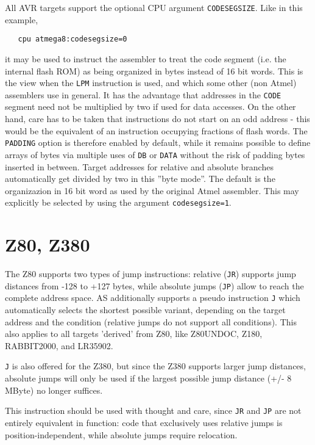 \documentclass[12pt,twoside]{report}
\newcommand{\asname}{{AS}}
\begin{document}
All AVR targets support the optional CPU argument {\tt CODESEGSIZE}.
Like in this example,
\begin{verbatim}
   cpu atmega8:codesegsize=0
\end{verbatim}
it may be used to instruct the assembler to treat the code segment (i.e.
the internal flash ROM) as being organized in bytes instead of 16 bit words.
This is the view when the {\tt LPM} instruction is used, and which some other
(non Atmel) assemblers use in general.  It has the advantage that addresses 
in the {\tt CODE} segment need not be multiplied by two if used for data
accesses.  On the other hand, care has to be taken that instructions do
not start on an odd address - this would be the equivalent of an instruction
occupying fractions of flash words.  The {\tt PADDING} option is therefore
enabled by default, while it remains possible to define arrays of bytes via
multiple uses of {\tt DB} or {\tt DATA} without the risk of padding bytes
inserted in between.  Target addresses for relative and absolute branches 
automatically get divided by two in this ''byte mode''.  The default is the
organizazion in 16 bit word as used by the original Atmel assembler.  This
may explicitly be selected by using the argument \verb!codesegsize=1!.


\section{Z80, Z380}

The Z80 supports two types of jump instructions: relative ({\tt JR}) supports
jump distances from -128 to +127 bytes, while absolute jumps  ({\tt JP})
allow to reach the complete address space. \asname{} additionally supports
a pseudo instruction {\tt J} which automatically selects the shortest
possible variant, depending on the target address and the condition (relative
jumps do not support all conditions).  This also applies to all targets
'derived' from Z80, like Z80UNDOC, Z180, RABBIT2000, and LR35902.

{\tt J} is also offered for the Z380, but since the Z380 supports larger
jump distances, absolute jumps will only be used if the largest possible
jump distance (+/- 8 MByte) no longer suffices.

This instruction should be used with thought and care, since {\tt JR} and
{\tt JP} are not entirely equivalent in function: code that exclusively
uses relative jumps is position-independent, while absolute jumps
require relocation.
\end{document}
